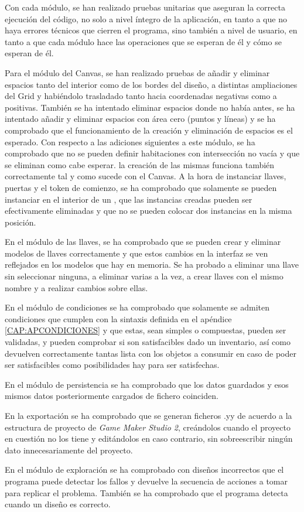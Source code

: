 Con cada módulo, se han realizado pruebas unitarias que aseguran la correcta ejecución del código, no solo a nivel íntegro de la aplicación, en tanto a que no haya errores técnicos que cierren el programa, sino también a nivel de usuario, en tanto a que cada módulo hace las operaciones que se esperan de él y cómo se esperan de él.

Para el módulo del Canvas, se han realizado pruebas de añadir y eliminar espacios tanto del interior como de los bordes del diseño, a distintas ampliaciones del Grid y habiéndolo trasladado tanto hacia coordenadas negativas como a positivas. También se ha intentado eliminar espacios donde no había antes, se ha intentado añadir y eliminar espacios con área cero (puntos y líneas) y se ha comprobado que el funcionamiento de la creación y eliminación de espacios es el esperado.
Con respecto a las adiciones siguientes a este módulo, se ha comprobado que no se pueden definir habitaciones con intersección no vacía y que se eliminan como cabe esperar. la creación de las mismas funciona también correctamente tal y como sucede con el Canvas.
A la hora de instanciar llaves, puertas y el token de comienzo, se ha comprobado que solamente se pueden instanciar en el interior de un , que las instancias creadas pueden ser efectivamente eliminadas y que no se pueden colocar dos instancias en la misma posición.

En el módulo de las llaves, se ha comprobado que se pueden crear y eliminar modelos de llaves correctamente y que estos cambios en la interfaz se ven reflejados en los modelos que hay en memoria. Se ha probado a eliminar una llave sin seleccionar ninguna, a eliminar varias a la vez, a crear llaves con el mismo nombre y a realizar cambios sobre ellas.

En el módulo de condiciones se ha comprobado que solamente se admiten condiciones que cumplen con la sintaxis definida en el apéndice \ref{CAP:APCONDICIONES} y que estas, sean simples o compuestas, pueden ser validadas, y pueden comprobar si son satisfacibles dado un inventario, así como devuelven correctamente tantas lista con los objetos a consumir en caso de poder ser satisfacibles como posibilidades hay para ser satisfechas.

En el módulo de persistencia se ha comprobado que los datos guardados y esos mismos datos posteriormente cargados de fichero coinciden.

En la exportación se ha comprobado que se generan ficheros .yy de acuerdo a la estructura de proyecto de \textit{Game Maker Studio 2}, creándolos cuando el proyecto en cuestión no los tiene y editándolos en caso contrario, sin sobreescribir ningún dato innecesariamente del proyecto.

En el módulo de exploración se ha comprobado con diseños incorrectos que el programa puede detectar los fallos y devuelve la secuencia de acciones a tomar para replicar el problema. También se ha comprobado que el programa detecta cuando un diseño es correcto.